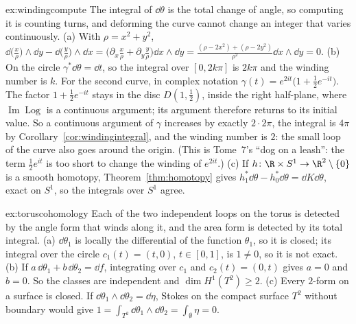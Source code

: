 \begin{solution}{ex:windingcompute}
\idea The integral of $\dd\theta$ is the total change of angle, so computing it is counting turns, and deforming the curve cannot change an integer that varies continuously.
\writeup (a) With $\rho=x^2+y^2$, $\dd\bigl(\frac x\rho\bigr)\wedge\dd y-\dd\bigl(\frac y\rho\bigr)\wedge\dd x=\bigl(\partial_x\frac x\rho+\partial_y\frac y\rho\bigr)\dd x\wedge\dd y=\frac{(\rho-2x^2)+(\rho-2y^2)}{\rho^2}\dd x\wedge\dd y=0$.
(b) On the circle $\gamma^*\dd\theta=\dd t$, so the integral over $[0,2k\pi]$ is $2k\pi$ and the winding number is $k$. For the second curve, in complex notation $\gamma(t)=e^{2it}\bigl(1+\frac12e^{-it}\bigr)$. The factor
$1+\frac12e^{-it}$ stays in the disc $D(1,\frac12)$, inside the right half-plane, where $\operatorname{Im}\operatorname{Log}$ is a continuous argument; its argument therefore
returns to its initial value. So a continuous argument of $\gamma$ increases by exactly $2\cdot2\pi$, the integral is $4\pi$ by Corollary~\ref{cor:windingintegral}, and the
winding number is $2$: the small loop of the curve also goes around the origin. (This is Tome~7's ``dog on a leash'': the term $\frac12e^{it}$ is too short to
change the winding of $e^{2it}$.) (c) If $h\colon\R\times S^1\to\R^2\setminus\{0\}$ is a smooth homotopy, Theorem~\ref{thm:homotopy} gives
$h_1^*\dd\theta-h_0^*\dd\theta=\dd K\dd\theta$, exact on $S^1$, so the integrals over $S^1$ agree.
\end{solution}

\begin{solution}{ex:toruscohomology}
\idea Each of the two independent loops on the torus is detected by the angle form that winds along it, and the area form is detected by its total integral.
\writeup (a) $\dd\theta_1$ is locally the differential of the function $\theta_1$, so it is closed; its integral over the circle $c_1(t)=(t,0)$, $t\in[0,1]$, is $1\ne0$, so it is not exact.
(b) If $a\,\dd\theta_1+b\,\dd\theta_2=\dd f$, integrating over $c_1$ and $c_2(t)=(0,t)$ gives $a=0$ and $b=0$. So the classes are independent and $\dim H^1(T^2)\ge2$. (c) Every $2$-form on
a surface is closed. If $\dd\theta_1\wedge\dd\theta_2=\dd\eta$, Stokes on the compact surface $T^2$ without boundary would give $1=\int_{T^2}\dd\theta_1\wedge\dd\theta_2=\int_{\emptyset}\eta=0$.
\end{solution}


